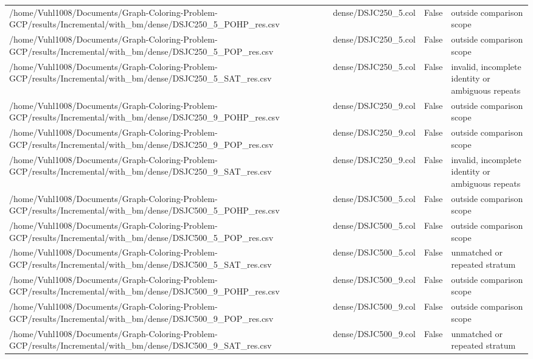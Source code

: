\begin{table}[htbp]
\begin{tabular}{llll}
/home/Vuhl1008/Documents/Graph-Coloring-Problem-GCP/results/Incremental/with\_bm/dense/DSJC250\_5\_POHP\_res.csv & dense/DSJC250\_5.col & False & outside comparison scope \\
/home/Vuhl1008/Documents/Graph-Coloring-Problem-GCP/results/Incremental/with\_bm/dense/DSJC250\_5\_POP\_res.csv & dense/DSJC250\_5.col & False & outside comparison scope \\
/home/Vuhl1008/Documents/Graph-Coloring-Problem-GCP/results/Incremental/with\_bm/dense/DSJC250\_5\_SAT\_res.csv & dense/DSJC250\_5.col & False & invalid, incomplete identity or ambiguous repeats \\
/home/Vuhl1008/Documents/Graph-Coloring-Problem-GCP/results/Incremental/with\_bm/dense/DSJC250\_9\_POHP\_res.csv & dense/DSJC250\_9.col & False & outside comparison scope \\
/home/Vuhl1008/Documents/Graph-Coloring-Problem-GCP/results/Incremental/with\_bm/dense/DSJC250\_9\_POP\_res.csv & dense/DSJC250\_9.col & False & outside comparison scope \\
/home/Vuhl1008/Documents/Graph-Coloring-Problem-GCP/results/Incremental/with\_bm/dense/DSJC250\_9\_SAT\_res.csv & dense/DSJC250\_9.col & False & invalid, incomplete identity or ambiguous repeats \\
/home/Vuhl1008/Documents/Graph-Coloring-Problem-GCP/results/Incremental/with\_bm/dense/DSJC500\_5\_POHP\_res.csv & dense/DSJC500\_5.col & False & outside comparison scope \\
/home/Vuhl1008/Documents/Graph-Coloring-Problem-GCP/results/Incremental/with\_bm/dense/DSJC500\_5\_POP\_res.csv & dense/DSJC500\_5.col & False & outside comparison scope \\
/home/Vuhl1008/Documents/Graph-Coloring-Problem-GCP/results/Incremental/with\_bm/dense/DSJC500\_5\_SAT\_res.csv & dense/DSJC500\_5.col & False & unmatched or repeated stratum \\
/home/Vuhl1008/Documents/Graph-Coloring-Problem-GCP/results/Incremental/with\_bm/dense/DSJC500\_9\_POHP\_res.csv & dense/DSJC500\_9.col & False & outside comparison scope \\
/home/Vuhl1008/Documents/Graph-Coloring-Problem-GCP/results/Incremental/with\_bm/dense/DSJC500\_9\_POP\_res.csv & dense/DSJC500\_9.col & False & outside comparison scope \\
/home/Vuhl1008/Documents/Graph-Coloring-Problem-GCP/results/Incremental/with\_bm/dense/DSJC500\_9\_SAT\_res.csv & dense/DSJC500\_9.col & False & unmatched or repeated stratum \\

\end{tabular}
\end{table}

